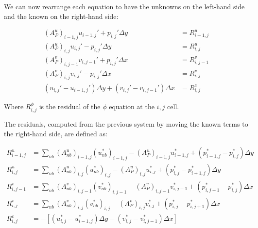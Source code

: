 We can now rearrange each equation to have the unknowns on the left-hand side and the known on the right-hand side:

\begin{align}
    (A_P^u)_{i-1,j} u_{i-1,j}' + p_{i,j}' \Delta y                      & = R^u_{i-1,j} \\
    (A_P^u)_{i,j}   u_{i,j}'   - p_{i,j}'   \Delta y                    & = R^u_{i,j}   \\
    (A_P^v)_{i,j-1} v_{i,j-1}' + p_{i,j}' \Delta x                      & = R^v_{i,j-1} \\
    (A_P^v)_{i,j}   v_{i,j}'   - p_{i,j}'   \Delta x                    & = R^v_{i,j}   \\
    (u_{i,j}' - u_{i-1,j}') \Delta y + (v_{i,j}' - v_{i,j-1}') \Delta x & = R^c_{i,j}
    \label{eq:residual_system}
\end{align}

Where $R^\phi_{i,j}$ is the residual of the $\phi$ equation at the $i,j$ cell.

The residuals, computed from the previous system by moving the known terms to the right-hand side, are defined as:

\begin{align}
    R^u_{i-1,j} & = \sum_{nb} (A_{nb}^u)_{i-1,j} (u_{nb}^*)_{i-1,j} - (A_P^u)_{i-1,j} u_{i-1,j}^*   + (p_{i-1,j}^* - p_{i,j}^*) \Delta y \\
    R^u_{i,j}   & = \sum_{nb} (A_{nb}^u)_{i,j} (u_{nb}^*)_{i,j} - (A_P^u)_{i,j} u_{i,j}^*           + (p_{i,j}^* - p_{i+1,j}^*) \Delta y \\
    R^v_{i,j-1} & = \sum_{nb} (A_{nb}^v)_{i,j-1} (v_{nb}^*)_{i,j-1} - (A_P^v)_{i,j-1} v_{i,j-1}^*   + (p_{i,j-1}^* - p_{i,j}^*) \Delta x \\
    R^v_{i,j}   & = \sum_{nb} (A_{nb}^v)_{i,j} (v_{nb}^*)_{i,j} - (A_P^v)_{i,j} v_{i,j}^*           + (p_{i,j}^* - p_{i,j+1}^*) \Delta x \\
    R^c_{i,j}   & = -\left[(u_{i,j}^* - u_{i-1,j}^*) \Delta y + (v_{i,j}^* - v_{i,j-1}^*) \Delta x\right]
\end{align}

